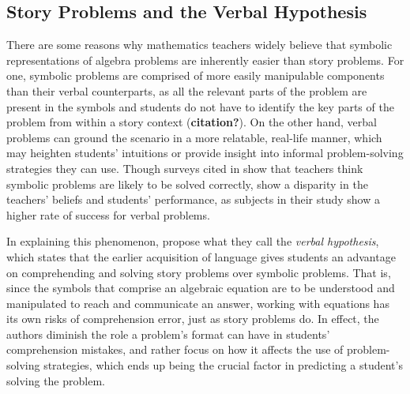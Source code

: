 \documentclass[10pt,letterpaper]{article}
\begin{document}
\subsection{Story Problems and the Verbal Hypothesis}

There are some reasons why mathematics teachers widely believe that symbolic representations of algebra problems are inherently easier than story problems. For one, symbolic problems are comprised of more easily manipulable components than their verbal counterparts, as all the relevant parts of the problem are present in the symbols and students do not have to identify the key parts of the problem from within a story context (\textbf{citation?}). On the other hand, verbal problems can ground the scenario in a more relatable, real-life manner, which may heighten students’ intuitions or provide insight into informal problem-solving strategies they can use. Though surveys cited in  show that teachers think symbolic problems are likely to be solved correctly,  show a disparity in the teachers' beliefs and students' performance, as  subjects in their study show a higher rate of success for verbal problems.

In explaining this phenomenon,  propose what they call the \textit{verbal hypothesis}, which states that the earlier acquisition of language gives students an advantage on comprehending and solving story problems over symbolic problems. That is, since the symbols that comprise an algebraic equation are to be understood and manipulated to reach and communicate an answer, working with equations has its own risks of comprehension error, just as story problems do. In effect, the authors diminish the role a problem's format can have in students' comprehension mistakes, and rather focus on how it affects the use of problem-solving strategies, which ends up being the crucial factor in predicting a student's solving the problem.
\end{document}
